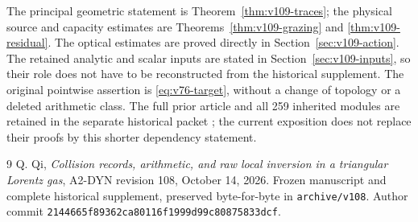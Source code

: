 \documentclass[11pt,reqno]{amsart}
\numberwithin{equation}{section}
\theoremstyle{definition}\newtheorem{definition}[theorem]{Definition}
\theoremstyle{remark}\newtheorem{remark}[theorem]{Remark}
\begin{document}
The principal geometric statement is Theorem~\ref{thm:v109-traces};
the physical source and capacity estimates are
Theorems~\ref{thm:v109-grazing} and \ref{thm:v109-residual}.
The optical estimates are proved directly in
Section~\ref{sec:v109-action}. The retained analytic and scalar inputs
are stated in Section~\ref{sec:v109-inputs}, so their role does not
have to be reconstructed from the historical supplement. The original
pointwise assertion is \eqref{eq:v76-target}, without a change of
topology or a deleted arithmetic class. The full prior article and
all 259 inherited modules are retained in the separate historical
packet \cite{Q108}; the current exposition does not replace their
proofs by this shorter dependency statement.





\appendix

\begin{thebibliography}{9}
 Q. Qi,
\emph{Collision records, arithmetic, and raw local inversion in a
triangular Lorentz gas}, A2-DYN revision 108, October 14, 2026.
Frozen manuscript and complete historical supplement, preserved
byte-for-byte in \texttt{archive/v108}. Author commit
\texttt{2144665f89362ca80116f1999d99c80875833dcf}.
\end{thebibliography}
\end{document}
